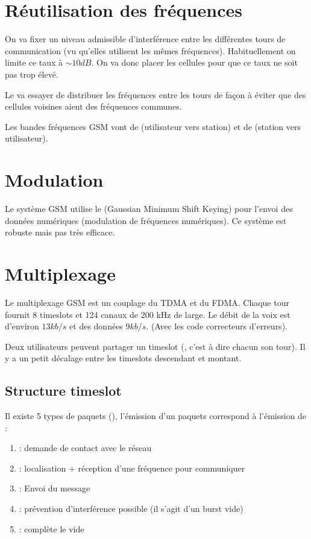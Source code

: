 \section{Réutilisation des fréquences}

On va fixer un niveau admissible d'interférence entre les différentes tours de communication (vu qu'elles utilisent les mêmes fréquences). Habituellement on limite ce taux à $\sim10 dB$. On va donc placer les cellules pour que ce taux ne soit pas trop élevé.

Le  va essayer de distribuer les fréquences entre les tours de façon à éviter que des cellules voisines aient des fréquences communes.

Les bandes fréquences GSM  vont de  (utilisateur vers station) et  de  (station vers utilisateur).

\section{Modulation}

Le système GSM utilise le  (Gaussian Minimum Shift Keying) pour l'envoi des données numériques (modulation de fréquences numériques). Ce système est robuste mais pas très efficace.

\section{Multiplexage}

Le multiplexage GSM est un couplage du TDMA et du FDMA. Chaque tour fournit 8 timeslots et 124 canaux de 200 kHz de large. Le débit de la voix est d'environ $13kb/s$ et des données $9 kb/s$.
(Avec les code correcteurs d'erreurs).

Deux utilisateurs peuvent partager un timeslot (, c'est à dire chacun son tour). Il y a un petit décalage entre les timeslots descendant et montant.

\subsection{Structure timeslot}

Il existe 5 types de paquets (), l’émission d'un paquets correspond à l'émission de :
\begin{enumerate}
  \item {}: demande de contact avec le réseau
  \item {}: localisation + réception d'une fréquence pour communiquer
  \item {}: Envoi du message
  \item {}: prévention d'interférence possible (il s'agit d'un burst vide)
  \item {}: complète le vide
\end{enumerate}

